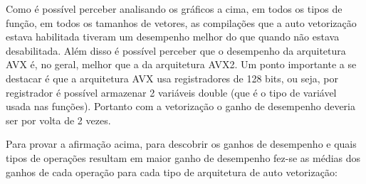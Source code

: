 \documentclass[11pt]{article}
\begin{document}
    \begin{center}
    \end{center}
    { \hspace*{\fill} \\}
    
    \begin{center}
    \end{center}
    { \hspace*{\fill} \\}
    
    \begin{center}
    \end{center}
    { \hspace*{\fill} \\}
    
    \begin{center}
    \end{center}
    { \hspace*{\fill} \\}
    
    \begin{center}
    \end{center}
    { \hspace*{\fill} \\}
    
    Como é possível perceber analisando os gráficos a cima, em todos os
tipos de função, em todos os tamanhos de vetores, as compilações que a
auto vetorização estava habilitada tiveram um desempenho melhor do que
quando não estava desabilitada. Além disso é possível perceber que o
desempenho da arquitetura AVX é, no geral, melhor que a da arquitetura
AVX2. Um ponto importante a se destacar é que a arquitetura AVX usa
registradores de 128 bits, ou seja, por registrador é possível armazenar
2 variáveis double (que é o tipo de variável usada nas funções).
Portanto com a vetorização o ganho de desempenho deveria ser por volta
de 2 vezes.

    Para provar a afirmação acima, para descobrir os ganhos de desempenho e
quais tipos de operações resultam em maior ganho de desempenho fez-se as
médias dos ganhos de cada operação para cada tipo de arquitetura de auto
vetorização:
\end{document}
